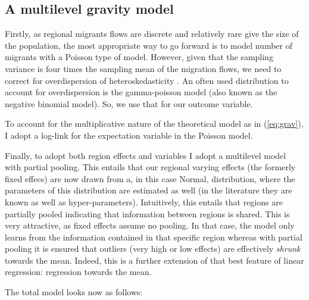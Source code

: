 \documentclass[fleqn,10pt]{SelfArx} %
\begin{document}
        \subsection{A multilevel gravity model}

        Firstly, as regional migrants flows are discrete and
        relatively rare give the size of the population, the most
        appropriate way to go forward is to model number of migrants
        with a Poisson type of model. However, given that the sampling
        variance is four times the sampling mean of the migration
        flows, we need to correct for overdispersion of
        heteroskedasticity \citep[][states that heteroskedasticity
        (rather than the presence of too many zeros) is responsible
        for the main differences.]{silva2006log}. An often used
        distribution to account for overdispersion is the
        gamma-poisson model (also known as the negative binomial
        model). So, we use that for our outcome variable. 

        To account for the multiplicative nature of the theoretical
        model as in (\ref{eq:grav}), I adopt a log-link for the
        expectation variable in the Poisson model.

        Finally, to adopt both region effects and variables I adopt a
        multilevel model with partial pooling. This entails that our
        regional varying effects (the formerly fixed effecs) are now
        drawn from a, in this case Normal, distribution, where the
        parameters of this distribution are estimated as well (in the
        literature they are known as well as
        hyper-parameters). Intuitively, this entails that regions are
        partially pooled indicating that information between regions
        is shared. This is very attractive, as fixed effects assume no
        pooling. In that case, the model only learns from the information contained
        in that specific region whereas with partial pooling it is ensured that
        outliers (very high or low effects) are effectively
        \emph{shrunk} towards the mean. Indeed, this is a further
        extension of that best feature of linear regression:
        regression towards the mean.

        The total model looks now as follows:
        
\end{document}
